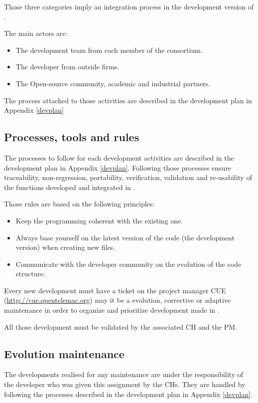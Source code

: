 Those three categories imply an integration process in the development version
of \telemacsystem.

The main actors are:
\begin{itemize}
\item The development team from each member of the consortium.
\item The developer from outside firms.
\item The Open-source community, academic and industrial partners.
\end{itemize}
The process attached to those activities are described in the development plan
in Appendix \ref{devplan}

\subsection{Processes, tools and rules}

The processes to follow for each development activities are described in the
development plan in Appendix \ref{devplan}. Following those processes ensure
traceability, non-regression, portability, verification, validation and
re-usability of the functions developed and integrated in \telemacsystem.

Those rules are based on the following principles:
\begin{itemize}
\item Keep the programming coherent with the existing one.
\item Always base yourself on the latest version of the code (the development
version) when creating new files.
\item Communicate with the developer community on the evolution of the code structure.
\end{itemize}

Every new development must have a ticket on the \telemacsystem project manager CUE
(\url{http://cue.opentelemac.org}) may it be a evolution, corrective or
adaptive maintenance in order to organize and prioritize development made in
\telemacsystem.

All those development must be validated by the associated CH and the PM.

\subsection{Evolution maintenance}

The developments realised for any maintenance are under the responsibility of
the developer who was given this assignment by the CHs.  They are handled by
following the processes described in the development plan in Appendix
\ref{devplan}.

